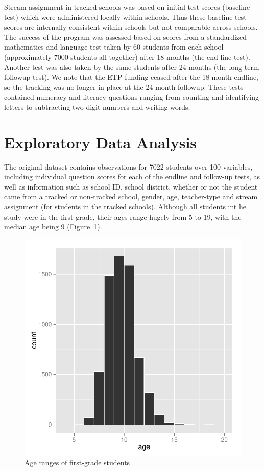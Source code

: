 \documentclass[11pt]{article}
\begin{document}
Stream assignment in tracked schools was based on initial test scores (baseline test) which were administered locally within schools. Thus these baseline test scores are internally consistent within schools but not comparable across schools. The success of the program was assessed based on scores from a standardized mathematics and language test taken by 60 students from each school (approximately 7000 students all together) after 18 months (the end line test). Another test was also taken by the same students after 24 months (the long-term followup test). We note that the ETP funding ceased after the 18 month endline, so the tracking was no longer in place at the 24 month followup. These tests contained numeracy and literacy questions ranging from counting and identifying letters to subtracting two-digit numbers and writing words.
 
 \section{Exploratory Data Analysis}
 The original dataset contains observations for 7022 students over 100 variables, including individual question scores for each of the endline and follow-up tests, as well as information such as school ID, school district, whether or not the student came from a tracked or non-tracked school, gender, age, teacher-type and stream assignment (for students in the tracked schools). Although all students int he study were in the first-grade, their ages range hugely from 5 to 19, with the median age being 9 (Figure~\ref{fig:age}).
 
  \begin{figure}[h]
 \centering
 \includegraphics[scale=0.6]{age.pdf}
 \caption{Age ranges of first-grade students}
 \label{fig:age}
 \end{figure} 
 
\end{document}
